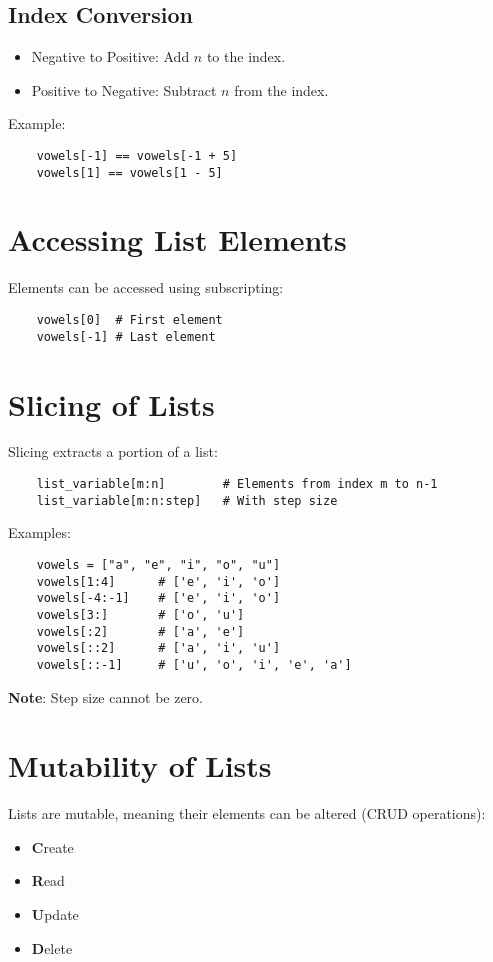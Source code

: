 \subsection{Index Conversion}
\begin{itemize}
	\item Negative to Positive: Add $n$ to the index.
	\item Positive to Negative: Subtract $n$ from the index.
\end{itemize}

\noindent Example:
\begin{verbatim}
	vowels[-1] == vowels[-1 + 5]
	vowels[1] == vowels[1 - 5]
\end{verbatim}

\section{Accessing List Elements}
Elements can be accessed using subscripting:
\begin{verbatim}
	vowels[0]  # First element
	vowels[-1] # Last element
\end{verbatim}

\section{Slicing of Lists}
Slicing extracts a portion of a list:
\begin{verbatim}
	list_variable[m:n]        # Elements from index m to n-1
	list_variable[m:n:step]   # With step size
\end{verbatim}

\noindent Examples:
\begin{verbatim}
	vowels = ["a", "e", "i", "o", "u"]
	vowels[1:4]      # ['e', 'i', 'o']
	vowels[-4:-1]    # ['e', 'i', 'o']
	vowels[3:]       # ['o', 'u']
	vowels[:2]       # ['a', 'e']
	vowels[::2]      # ['a', 'i', 'u']
	vowels[::-1]     # ['u', 'o', 'i', 'e', 'a']
\end{verbatim}

\noindent \textbf{Note}: Step size cannot be zero.

\section{Mutability of Lists}
Lists are mutable, meaning their elements can be altered (CRUD operations):
\begin{itemize}
	\item \textbf{C}reate
	\item \textbf{R}ead
	\item \textbf{U}pdate
	\item \textbf{D}elete
\end{itemize}

